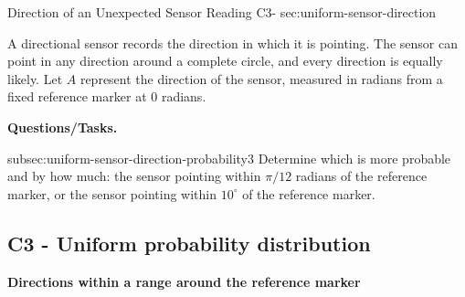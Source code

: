 	
	\sectionScored
	{Direction of an Unexpected Sensor Reading}
	{C3-}
	{sec:uniform-sensor-direction}
	{
		A directional sensor records the direction in which it is pointing.
		The sensor can point in any direction around a complete circle, and
		every direction is equally likely. Let \(A\) represent the direction
		of the sensor, measured in radians from a fixed reference marker at
		\(0\) radians.
		
		\textbf{Questions/Tasks.}
		\begin{enumerate}
			\CriterionTask
			{subsec:uniform-sensor-direction-probability}{3}
			{Determine which is more probable and by how much: the sensor
				pointing within \(\pi/12\) radians of the reference marker,
				or the sensor pointing within \(10^\circ\) of the reference
				marker. }
		\end{enumerate}
		
		\label{subsec:uniform-sensor-direction-probability}
		\subsection*{C3 - Uniform probability distribution }
		
		\noindent
		\begin{center}
			\textbf{Directions within a range around the reference marker}
		\end{center}
		
		\noindent
		\begin{minipage}[t]{0.48\textwidth}
			

\end{minipage}}
